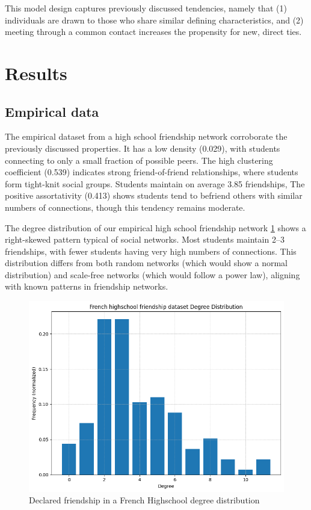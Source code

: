 \documentclass[runningheads]{llncs}
\begin{document}
This model design captures previously discussed tendencies, namely that (1) individuals are drawn to those who share similar defining characteristics, and (2) meeting through a common contact increases the propensity for new, direct ties.

\section{Results}
\subsection{Empirical data}

The empirical dataset from a high school friendship network corroborate the previously discussed properties. It has a low density (0.029), with students connecting to only a small fraction of possible peers. The high clustering coefficient (0.539) indicates strong friend-of-friend relationships, where students form tight-knit social groups. Students maintain on average 3.85 friendships, The positive assortativity (0.413) shows students tend to befriend others with similar numbers of connections, though this tendency remains moderate.

 The degree distribution of our empirical high school friendship network \ref{fig:empirical_degree_distribution} shows a right-skewed pattern typical of social networks. Most students maintain 2–3 friendships, with fewer students having very high numbers of connections. This distribution differs from both random networks (which would show a normal distribution) and scale-free networks (which would follow a power law), aligning with known patterns in friendship networks.

\begin{figure}[h]
    \centering
    \includegraphics[width=0.9\linewidth]{empirical_degree_distribution.png}
    \caption{Declared friendship in a French Highschool degree distribution}
    \label{fig:empirical_degree_distribution}
\end{figure}
\end{document}
